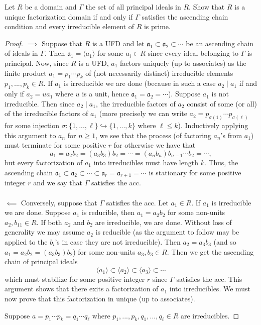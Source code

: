 \begin{problem}
Let $R$ be a domain and $\Gamma$ the set of all principal ideals
in $R$. Show that $R$ is a unique factorization domain if and
only if $\Gamma$ satisfies the ascending chain condition and
every irreducible element of $R$ is prime.
\end{problem}
\begin{proof}
$\implies$ Suppose that $R$ is a UFD and let
$\mathfrak{a}_1\subset\mathfrak{a}_2\subset\cdots$ be an
ascending chain of ideals in $\Gamma$. Then
$\mathfrak{a}_1=\langle a_1\rangle$ for some $a_i\in R$ since
every ideal belonging to $\Gamma$ is principal. Now, since $R$ is
a UFD, $a_1$ factors uniquely (up to associates) as the finite
product $a_1=p_1\cdots p_k$ of (not necessarily distinct)
irreducible elements $p_1,...,p_k\in R$. If $a_1$ is irreducible
we are done (because in such a case $a_2\mid a_1$ if and only if
$a_2=ua_1$ where $u$ is a unit, hence
$\mathfrak{a}_1=\mathfrak{a}_2=\cdots$). Suppose $a_1$ is not
irreducible. Then since $a_2\mid a_1$, the irreducible factors of
$a_2$ consist of some (or all) of the irreducible factors of
$a_1$ (more precisely we can write $a_2=p_{\sigma(1)}\cdots
p_{\sigma(\ell)}$ for some injection
$\sigma\colon\{1,...,\ell\}\hookrightarrow\{1,...,k\}$ where
$\ell\leq k$). Inductively applying this argument to $a_n$ for
$n\geq 1$, we see that the process (of factoring $a_n$'s from
$a_1$) must terminate for some positive $r$ for otherwise we have
that
\[
a_1
=
a_2b_2=(a_3b_3)b_2
=
\cdots
=
(a_nb_n)b_{n-1}\cdots
b_2
=
\cdots,
\]
but every factorization of $a_1$ into irreducibles must have
length $k$. Thus, the ascending chain
$\mathfrak{a}_1\subset\mathfrak{a}_2\subset\cdots\subset\mathfrak{a}_r=\mathfrak{a}_{r+1}=\cdots$
is stationary for some positive integer $r$ and we say that
$\Gamma$ satisfies the acc.
\\\\
$\impliedby$ Conversely, suppose that $\Gamma$ satisfies the
acc. Let $a_1\in R$. If $a_1$ is irreducible we are done. Suppose
$a_1$ is reducible, then $a_1=a_2b_2$ for some non-units
$a_2,b_{11}\in R$. If both $a_2$ and $b_2$ are irreducible, we
are done. Without loss of generality we may assume $a_2$ is
reducible (as the argument to follow may be applied to the
$b_i$'s in case they are not irreducible). Then $a_2=a_3b_3$ (and
so $a_1=a_2b_2=(a_3b_3)b_2$) for some non-units $a_3,b_3\in
R$. Then we get the ascending chain of principal ideals
\[
\langle a_1\rangle\subset\langle a_2\rangle\subset\langle a_3\rangle\subset\cdots
\]
which must stabilize for some positive integer $r$ since $\Gamma$
satisfies the acc. This argument shows that there exits a
factorization of $a_1$ into irreducibles. We must now prove that
this factorization in unique (up to associates).

Suppose $a=p_1\cdots p_k=q_1\cdots q_\ell$ where
$p_1,...,p_k,q_1,...,q_\ell\in R$ are irreducibles.
\end{proof}
